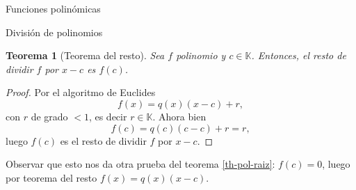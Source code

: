 \documentclass[a4paper,12pt,twoside,spanish,reqno]{amsbook}
\newtheorem{teorema}{Teorema}[section]
\theoremstyle{definition}
\theoremstyle{remark}
\newcommand{\K}{\mathbb K}
\begin{document}
\begin{chapter}{Funciones polinómicas}
\begin{section}{División de polinomios}
\begin{teorema}[Teorema del  resto] Sea $f$ polinomio y $c \in \K$. Entonces,  el resto de dividir $f$ por $x-c$ es $f(c)$. 
\end{teorema}
\begin{proof} Por  el algoritmo de Euclides
	\begin{equation*}
		f(x) = q(x)(x-c) + r,
	\end{equation*}
	con $r$ de grado $<1$,  es decir $r \in \K$.  Ahora bien
	\begin{equation*}
	f(c) = q(c)(c-c) + r = r,
	\end{equation*}
	luego $f(c)$  es el resto de dividir $f$ por $x-c$. 
\end{proof}

Observar que esto  nos da otra prueba del teorema \ref{th-pol-raiz}: $f(c)=0$, luego por teorema del resto $ f(x)=q(x)(x-c)$. 
		
	\end{section}	
	\end{chapter}	
\end{document}
